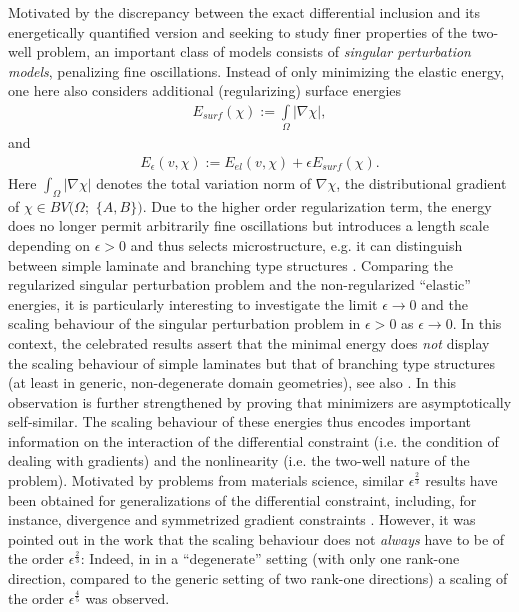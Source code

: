 \documentclass[a4paper, 10pt, twoside, notitlepage]{amsart}
\theoremstyle{plain}
\begin{document}
	Motivated by the discrepancy between the exact differential inclusion and its energetically quantified version and seeking to study finer properties of the two-well problem, an important  class of models consists of \emph{singular perturbation models}, penalizing fine oscillations. Instead of only minimizing the elastic energy, one here also considers additional (regularizing) surface energies
	\begin{align*}
		E_{surf}(\chi):= \int\limits_{\Omega} |\nabla \chi|,
	\end{align*} 
	and
	\begin{align*}
		E_{\epsilon}(v,\chi) := E_{el}( v, \chi) + \epsilon E_{surf}(\chi).
	\end{align*}
	Here $\int_{\Omega} |\nabla \chi|$ denotes the total variation norm of $\nabla \chi$, the distributional gradient of $\chi \in BV(\Omega;$ $ \{A,B\})$.  Due to the higher order regularization term, the energy does no longer permit arbitrarily
	fine oscillations but introduces a length scale depending on $\epsilon>0$ and thus selects microstructure, e.g. it can distinguish between simple laminate and branching type
	structures \cite{KM92,KM94}. Comparing the regularized singular perturbation problem and the non-regularized ``elastic'' energies, it is particularly interesting to investigate the limit
	$\epsilon \rightarrow 0$ and the scaling behaviour of the singular perturbation problem in $\epsilon>0$ as $\epsilon \rightarrow 0$. In this context, the celebrated results \cite{KM92,KM94}
	assert that the minimal energy does \emph{not} display the scaling behaviour of simple laminates but that of branching type structures (at least in generic, non-degenerate domain geometries),
	see also \cite{CC15}. In \cite{C1} this observation is further strengthened by proving that minimizers are asymptotically self-similar.  The scaling behaviour of these energies thus encodes
	important information on the interaction of the differential constraint (i.e. the condition of dealing with gradients) and the nonlinearity (i.e. the two-well nature of the problem).
	Motivated by problems from materials science, similar $\epsilon^{\frac{2}{3}}$ results have been obtained for generalizations of the differential constraint, including, for instance,
	divergence and symmetrized gradient constraints \cite{CO09, CO12, KW14,CKO99}. However, it was pointed out in the work \cite{CC15} that the scaling behaviour does not \emph{always} have to be
	of the order $\epsilon^{\frac{2}{3}}$: Indeed, in \cite{CC15} in a ``degenerate'' setting (with only one rank-one direction, compared to the generic setting of two rank-one directions) a scaling of the order $\epsilon^{\frac{4}{5}}$ was observed.
	
\end{document}
